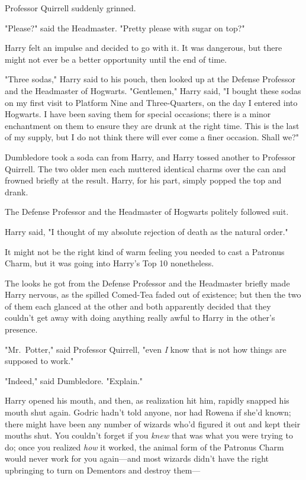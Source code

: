 Professor Quirrell suddenly grinned.

"Please?" said the Headmaster. "Pretty please with sugar on top?"

Harry felt an impulse and decided to go with it. It was dangerous, but there
might not ever be a better opportunity until the end of time.

"Three sodas," Harry said to his pouch, then looked up at the Defense Professor
and the Headmaster of Hogwarts. "Gentlemen," Harry said, "I bought these sodas
on my first visit to Platform Nine and Three-Quarters, on the day I entered
into Hogwarts. I have been saving them for special occasions; there is a minor
enchantment on them to ensure they are drunk at the right time. This is the
last of my supply, but I do not think there will ever come a finer occasion.
Shall we?"

Dumbledore took a soda can from Harry, and Harry tossed another to Professor
Quirrell. The two older men each muttered identical charms over the can and
frowned briefly at the result. Harry, for his part, simply popped the top and
drank.

The Defense Professor and the Headmaster of Hogwarts politely followed suit.

Harry said, "I thought of my absolute rejection of death as the natural order."

It might not be the right kind of warm feeling you needed to cast a Patronus
Charm, but it was going into Harry's Top 10 nonetheless.

The looks he got from the Defense Professor and the Headmaster briefly made
Harry nervous, as the spilled Comed-Tea faded out of existence; but then the
two of them each glanced at the other and both apparently decided that they
couldn't get away with doing anything really awful to Harry in the other's
presence.

"Mr.~Potter," said Professor Quirrell, "even \emph{I} know that is not how
things are supposed to work."

"Indeed," said Dumbledore. "Explain."

Harry opened his mouth, and then, as realization hit him, rapidly snapped his
mouth shut again. Godric hadn't told anyone, nor had Rowena if she'd known;
there might have been any number of wizards who'd figured it out and kept their
mouths shut. You couldn't forget if you \emph{knew} that was what you were
trying to do; once you realized \emph{how} it worked, the animal form of the
Patronus Charm would never work for you again---and most wizards didn't have
the right upbringing to turn on Dementors and destroy them---

